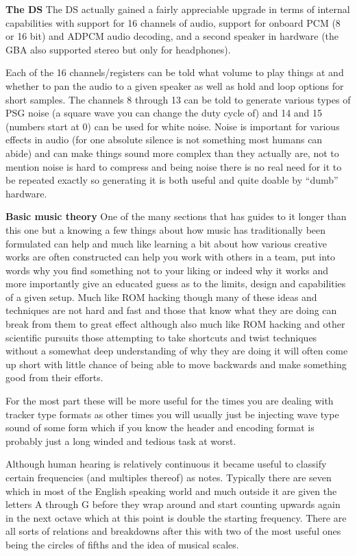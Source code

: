 \documentclass[
]{book}
\begin{document}
\textbf{The DS} The DS actually gained a fairly appreciable upgrade in terms of internal capabilities with support for 16 channels of audio, support for onboard PCM (8 or 16 bit) and ADPCM audio decoding, and a second speaker in hardware (the GBA also supported stereo but only for headphones).

Each of the 16 channels/registers can be told what volume to play things at and whether to pan the audio to a given speaker as well as hold and loop options for short samples. The channels 8 through 13 can be told to generate various types of PSG noise (a square wave you can change the duty cycle of) and 14 and 15 (numbers start at 0) can be used for white noise. Noise is important for various effects in audio (for one absolute silence is not something most humans can abide) and can make things sound more complex than they actually are, not to mention noise is hard to compress and being noise there is no real need for it to be repeated exactly so generating it is both useful and quite doable by ``dumb'' hardware.

\textbf{Basic music theory} One of the many sections that has guides to it longer than this one but a knowing a few things about how music has traditionally been formulated can help and much like learning a bit about how various creative works are often constructed can help you work with others in a team, put into words why you find something not to your liking or indeed why it works and more importantly give an educated guess as to the limits, design and capabilities of a given setup. Much like ROM hacking though many of these ideas and techniques are not hard and fast and those that know what they are doing can break from them to great effect although also much like ROM hacking and other scientific pursuits those attempting to take shortcuts and twist techniques without a somewhat deep understanding of why they are doing it will often come up short with little chance of being able to move backwards and make something good from their efforts.

For the most part these will be more useful for the times you are dealing with tracker type formats as other times you will usually just be injecting wave type sound of some form which if you know the header and encoding format is probably just a long winded and tedious task at worst.

Although human hearing is relatively continuous it became useful to classify certain frequencies (and multiples thereof) as notes. Typically there are seven which in most of the English speaking world and much outside it are given the letters A through G before they wrap around and start counting upwards again in the next octave which at this point is double the starting frequency. There are all sorts of relations and breakdowns after this with two of the most useful ones being the circles of fifths and the idea of musical scales.
\end{document}
